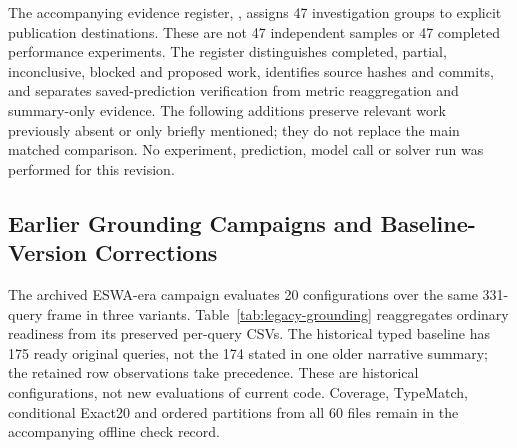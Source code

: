 The accompanying evidence register, , assigns 47 investigation groups to explicit publication destinations. These are not 47 independent samples or 47 completed performance experiments. The register distinguishes completed, partial, inconclusive, blocked and proposed work, identifies source hashes and commits, and separates saved-prediction verification from metric reaggregation and summary-only evidence. The following additions preserve relevant work previously absent or only briefly mentioned; they do not replace the main matched comparison. No experiment, prediction, model call or solver run was performed for this revision.

\subsection{Earlier Grounding Campaigns and Baseline-Version Corrections}
The archived ESWA-era campaign evaluates 20 configurations over the same 331-query frame in three variants. Table~\ref{tab:legacy-grounding} reaggregates ordinary readiness from its preserved per-query CSVs. The historical typed baseline has 175 ready original queries, not the 174 stated in one older narrative summary; the retained row observations take precedence. These are historical configurations, not new evaluations of current code. Coverage, TypeMatch, conditional Exact20 and ordered partitions from all 60 files remain in the accompanying offline check record.

